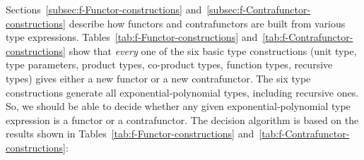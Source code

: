 Sections~\ref{subsec:f-Functor-constructions} and~\ref{subsec:f-Contrafunctor-constructions}
describe how functors and contrafunctors are built from various type
expressions. Tables~\ref{tab:f-Functor-constructions} and~\ref{tab:f-Contrafunctor-constructions}
show that \emph{every} one of the six basic type constructions
(unit type, type parameters, product types, co-product types, function
types, recursive types) gives either a new functor or a new contrafunctor.
The six type constructions generate all exponential-polynomial
types, including recursive ones. So, we should be able to decide whether
any given exponential-polynomial type expression is a functor or a
contrafunctor. The decision algorithm is based on the results shown
in Tables~\ref{tab:f-Functor-constructions} and~\ref{tab:f-Contrafunctor-constructions}:
